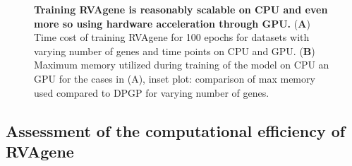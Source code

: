 
\begin{center}
    \begin{figure}
        \caption[Computational cost of training RVAgene]{\textbf{Training RVAgene is reasonably scalable on CPU and even more so using hardware acceleration through GPU.} ({\bf A}) Time cost of training RVAgene for 100 epochs for datasets with varying number of genes and time points on CPU and GPU. ({\bf B}) Maximum memory utilized during training of the model on CPU an GPU for the cases in (A), inset plot: comparison of max memory used compared to DPGP for varying number of genes.}
  \label{fig:fig7}
\end{figure}
\end{center}


\subsection{Assessment of the computational efficiency of RVAgene}

